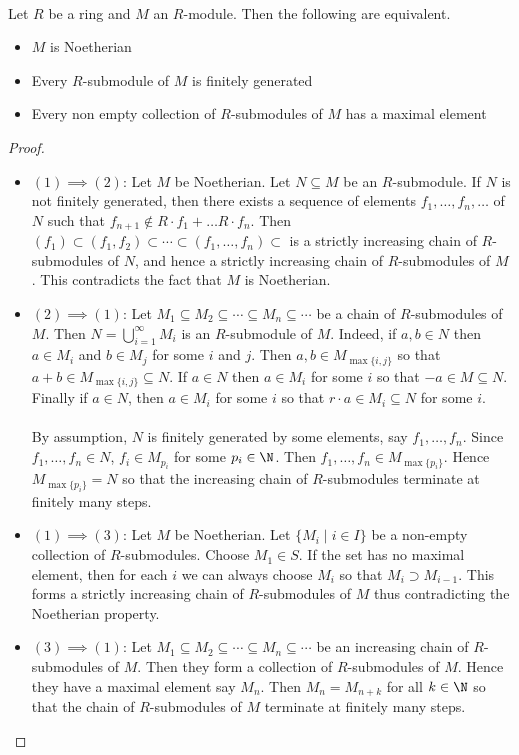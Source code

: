 \documentclass[a4paper]{article}
\begin{document}
\begin{prp}{}{}\\
Let $R$ be a ring and $M$ an $R$-module. Then the following are equivalent. 
\begin{itemize}
\item $M$ is Noetherian
\item Every $R$-submodule of $M$ is finitely generated
\item Every non empty collection of $R$-submodules of $M$ has a maximal element
\end{itemize} 
\begin{proof}~\\
\begin{itemize}
\item $(1)\implies(2)$: Let $M$ be Noetherian. Let $N\subseteq M$ be an $R$-submodule. If $N$ is not finitely generated, then there exists a sequence of elements $f_1,\dots,f_n,\dots$ of $N$ such that $f_{n+1}\notin R\cdot f_1+\dots R\cdot f_n$. Then $(f_1)\subset (f_1,f_2)\subset\cdots\subset(f_1,\dots,f_n)\subset$ is a strictly increasing chain of $R$-submodules of $N$, and hence a strictly increasing chain of $R$-submodules of $M$. This contradicts the fact that $M$ is Noetherian. 
\item $(2)\implies(1)$: Let $M_1\subseteq M_2\subseteq\cdots\subseteq M_n\subseteq\cdots$ be a chain of $R$-submodules of $M$. Then $N=\bigcup_{i=1}^\infty M_i$ is an $R$-submodule of $M$. Indeed, if $a,b\in N$ then $a\in M_i$ and $b\in M_j$ for some $i$ and $j$. Then $a,b\in M_{\max\{i,j\}}$ so that $a+b\in M_{\max\{i,j\}}\subseteq N$. If $a\in N$ then $a\in M_i$ for some $i$ so that $-a\in M\subseteq N$. Finally if $a\in N$, then $a\in M_i$ for some $i$ so that $r\cdot a\in M_i\subseteq N$ for some $i$. \\~\\

By assumption, $N$ is finitely generated by some elements, say $f_1,\dots,f_n$. Since $f_1,\dots,f_n\in N$, $f_i\in M_{p_i}$ for some $p_i\in\N$. Then $f_1,\dots,f_n\in M_{\max\{p_i\}}$. Hence $M_{\max\{p_i\}}=N$ so that the increasing chain of $R$-submodules terminate at finitely many steps. 
\item $(1)\implies(3)$: Let $M$ be Noetherian. Let $\{M_i\;|\;i\in I\}$ be a non-empty collection of $R$-submodules. Choose $M_1\in S$. If the set has no maximal element, then for each $i$ we can always choose $M_i$ so that $M_i\supset M_{i-1}$. This forms a strictly increasing chain of $R$-submodules of $M$ thus contradicting the Noetherian property. 
\item $(3)\implies(1)$: Let $M_1\subseteq M_2\subseteq\cdots\subseteq M_n\subseteq\cdots$ be an increasing chain of $R$-submodules of $M$. Then they form a collection of $R$-submodules of $M$. Hence they have a maximal element say $M_n$. Then $M_n=M_{n+k}$ for all $k\in\N$ so that the chain of $R$-submodules of $M$ terminate at finitely many steps. 
\end{itemize}
\end{proof}
\end{prp}
\end{document}
